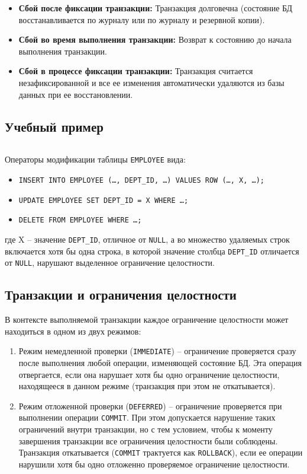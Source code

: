 \documentclass[a4paper,12pt]{article}
\begin{document}
\begin{itemize}
    \item \textbf{Сбой после фиксации транзакции:} Транзакция долговечна (состояние БД восстанавливается по журналу или по журналу и резервной копии).
    \item \textbf{Сбой во время выполнения транзакции:} Возврат к состоянию до начала выполнения транзакции.
    \item \textbf{Сбой в процессе фиксации транзакции:} Транзакция считается незафиксированной и все ее изменения автоматически удаляются из базы данных при ее восстановлении.
\end{itemize}

\subsection{Учебный пример}

\begin{lstlisting}

\end{lstlisting}

Операторы модификации таблицы \texttt{EMPLOYEE} вида:
\begin{itemize}
    \item \texttt{INSERT INTO EMPLOYEE (…, DEPT\_ID, …) VALUES ROW (…, X, …);}
    \item \texttt{UPDATE EMPLOYEE SET DEPT\_ID = X WHERE …;}
    \item \texttt{DELETE FROM EMPLOYEE WHERE …;}
\end{itemize}
где X – значение \texttt{DEPT\_ID}, отличное от \texttt{NULL}, а во множество удаляемых строк включается хотя бы одна строка, в которой значение столбца \texttt{DEPT\_ID} отличается от \texttt{NULL}, нарушают выделенное ограничение целостности.

\subsection{Транзакции и ограничения целостности}

В контексте выполняемой транзакции каждое ограничение целостности может находиться в одном из двух режимов:
\begin{enumerate}
    \item Режим немедленной проверки (\texttt{IMMEDIATE}) – ограничение проверяется сразу после выполнения любой операции, изменяющей состояние БД. Эта операция отвергается, если она нарушает хотя бы одно ограничение целостности, находящееся в данном режиме (транзакция при этом не откатывается).
    \item Режим отложенной проверки (\texttt{DEFERRED}) – ограничение проверяется при выполнении операции \texttt{COMMIT}. При этом допускается нарушение таких ограничений внутри транзакции, но с тем условием, чтобы к моменту завершения транзакции все ограничения целостности были соблюдены. Транзакция откатывается (\texttt{COMMIT} трактуется как \texttt{ROLLBACK}), если ее операции нарушили хотя бы одно отложенно проверяемое ограничение целостности.
\end{enumerate}
\end{document}
